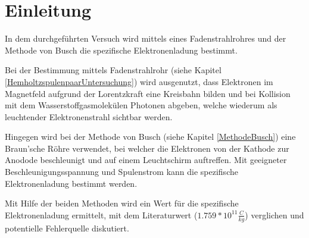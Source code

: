 \chapter{Einleitung}
\label{Einleitung}
In dem durchgeführten Versuch wird mittels eines Fadenstrahlrohres und der Methode von Busch die spezifische Elektronenladung bestimmt. 

Bei der Bestimmung mittels Fadenstrahlrohr (siehe Kapitel \ref{HemholtzspulenpaarUntersuchung}) wird ausgenutzt, dass Elektronen im Magnetfeld aufgrund der Lorentzkraft eine Kreisbahn bilden und bei Kollision mit dem Wasserstoffgasmolekülen Photonen abgeben, welche wiederum als leuchtender Elektronenstrahl sichtbar werden.

Hingegen wird bei der Methode von Busch (siehe Kapitel \ref{MethodeBusch}) eine Braun'sche Röhre verwendet, bei welcher die Elektronen von der Kathode zur Anodode beschleunigt und auf einem Leuchtschirm auftreffen. Mit geeigneter Beschleunigungsspannung und Spulenstrom kann die spezifische Elektronenladung bestimmt werden.

Mit Hilfe der beiden Methoden wird ein Wert für die spezifische Elektronenladung ermittelt, mit dem Literaturwert ($1.759*10^{11}\frac{C}{kg}$)\cite{uniElektLadung}  verglichen und potentielle Fehlerquelle diskutiert.
